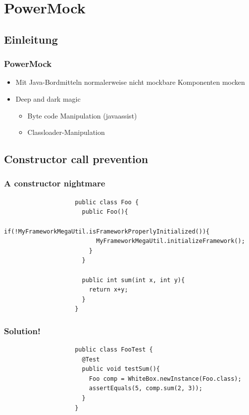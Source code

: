 \documentclass{beamer}
\begin{document}
	\section{PowerMock}

		\subsection{Einleitung}

			\begin{frame}
				\frametitle{PowerMock}

				\begin{itemize}
					\item{Mit Java-Bordmitteln normalerweise nicht mockbare Komponenten mocken}
					\item{Deep and dark magic}
						\begin{itemize}
							\item{Byte code Manipulation (javaassist)}
							\item{Classloader-Manipulation}
						\end{itemize}
				\end{itemize}
			\end{frame}

		\subsection{Constructor call prevention}

			\begin{frame}[fragile]
				\frametitle{A constructor nightmare}

				\begin{lstlisting}
					public class Foo {
					  public Foo(){
					    if(!MyFrameworkMegaUtil.isFrameworkProperlyInitialized()){
					      MyFrameworkMegaUtil.initializeFramework();	
					    }
					  }

					  public int sum(int x, int y){
					    return x+y;
					  }
					}
				\end{lstlisting}
			\end{frame}

			\begin{frame}[fragile]
				\frametitle{Solution!}

				\begin{lstlisting}
					public class FooTest {
					  @Test
					  public void testSum(){
					    Foo comp = WhiteBox.newInstance(Foo.class);
					    assertEquals(5, comp.sum(2, 3));
					  }
					}
				\end{lstlisting}
			\end{frame}
\end{document}
